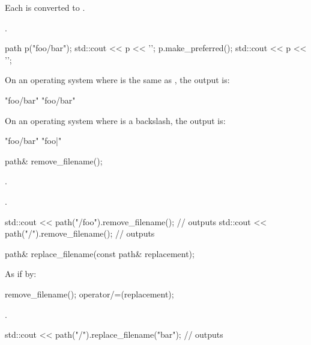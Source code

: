 \begin{itemdescr}
\pnum
\effects Each 
  is converted to .

\pnum
\returns {}.

\pnum
\begin{example}
\begin{codeblock}
path p("foo/bar");
std::cout << p << '\n';
p.make_preferred();
std::cout << p << '\n';
\end{codeblock}
On an operating system where  is the same as
, the output is:
\begin{codeblock}
"foo/bar"
"foo/bar"
\end{codeblock}
On an operating system where  is a backslash, the
output is:
\begin{codeblock}
"foo/bar"
"foo\bar"
\end{codeblock}
\end{example}
\end{itemdescr}

\begin{itemdecl}
path& remove_filename();
\end{itemdecl}

\begin{itemdescr}
\pnum
\postcondition {}.

\pnum
\returns {}.

\pnum
\begin{example}
\begin{codeblock}
std::cout << path("/foo").remove_filename();  // outputs 
std::cout << path("/").remove_filename();     // outputs 
\end{codeblock}
\end{example}
\end{itemdescr}

\begin{itemdecl}
path& replace_filename(const path& replacement);
\end{itemdecl}

\begin{itemdescr}
\pnum
\effects
As if by:
\begin{codeblock}
remove_filename();
operator/=(replacement);
\end{codeblock}

\pnum
\returns {}.

\pnum
\begin{example}
\begin{codeblock}
std::cout << path("/").replace_filename("bar");     // outputs 
\end{codeblock}
\end{example}
\end{itemdescr}

